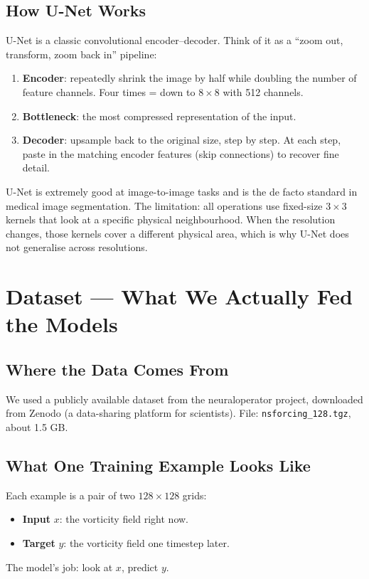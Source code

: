 \documentclass[11pt,twocolumn]{article}
\begin{document}
\subsection{How U-Net Works}

U-Net is a classic convolutional encoder--decoder.
Think of it as a ``zoom out, transform, zoom back in'' pipeline:

\begin{enumerate}
  \item \textbf{Encoder}: repeatedly shrink the image by half while doubling
        the number of feature channels. Four times = down to $8 \times 8$ with
        512 channels.
  \item \textbf{Bottleneck}: the most compressed representation of the input.
  \item \textbf{Decoder}: upsample back to the original size, step by step.
        At each step, paste in the matching encoder features (skip connections)
        to recover fine detail.
\end{enumerate}

U-Net is extremely good at image-to-image tasks and is the de facto standard in
medical image segmentation.
The limitation: all operations use fixed-size $3 \times 3$ kernels that look at
a specific physical neighbourhood.
When the resolution changes, those kernels cover a different physical area,
which is why U-Net does not generalise across resolutions.

\section{Dataset --- What We Actually Fed the Models}

\subsection{Where the Data Comes From}

We used a publicly available dataset from the neuraloperator project, downloaded
from Zenodo (a data-sharing platform for scientists).
File: \texttt{nsforcing\_128.tgz}, about 1.5 GB.

\subsection{What One Training Example Looks Like}

Each example is a pair of two $128 \times 128$ grids:
\begin{itemize}
  \item \textbf{Input} $x$: the vorticity field right now.
  \item \textbf{Target} $y$: the vorticity field one timestep later.
\end{itemize}
The model's job: look at $x$, predict $y$.
\end{document}
